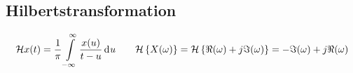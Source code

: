 \subsection{Hilbertstransformation}
\[
  \mathcal{H} x(t) = \frac{1}{\pi} \int\limits_{-\infty}^{\infty}
    \frac{x(u)}{t - u} \,\mathrm{d}^{} u
  \qquad
  \mathcal{H} \left\{ X(\omega) \right\}
    = \mathcal{H} \left\{ \Re(\omega) + j\Im(\omega) \right\}
    = - \Im(\omega) + j\Re(\omega)
\]
